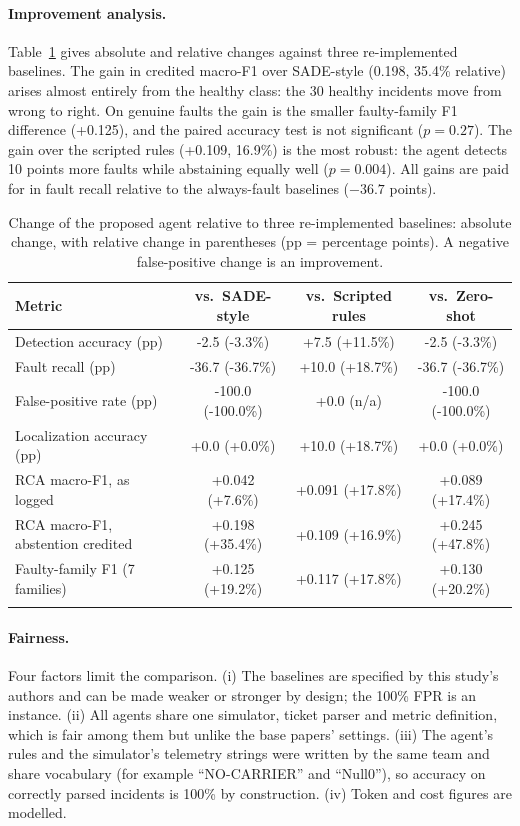 \documentclass[pdflatex,sn-basic,Numbered,iicol]{sn-jnl}
\begin{document}
\paragraph{Improvement analysis.} Table~\ref{tab:improve} gives absolute and relative changes against three re-implemented baselines. The gain in credited macro-F1 over SADE-style (0.198, 35.4\% relative) arises almost entirely from the healthy class: the 30 healthy incidents move from wrong to right. On genuine faults the gain is the smaller faulty-family F1 difference (+0.125), and the paired accuracy test is not significant ($p=0.27$). The gain over the scripted rules (+0.109, 16.9\%) is the most robust: the agent detects 10 points more faults while abstaining equally well ($p=0.004$). All gains are paid for in fault recall relative to the always-fault baselines ($-36.7$ points).

\begin{table}[t]
\caption{Change of the proposed agent relative to three re-implemented baselines: absolute change, with relative change in parentheses (pp = percentage points). A negative false-positive change is an improvement.}\label{tab:improve}
\scriptsize
\begin{tabular}{@{}lccc@{}}
\toprule
Metric & vs.\ SADE-style & vs.\ Scripted rules & vs.\ Zero-shot \\
\midrule
Detection accuracy (pp) & -2.5 (-3.3\%) & +7.5 (+11.5\%) & -2.5 (-3.3\%) \\
Fault recall (pp) & -36.7 (-36.7\%) & +10.0 (+18.7\%) & -36.7 (-36.7\%) \\
False-positive rate (pp) & -100.0 (-100.0\%) & +0.0 (n/a) & -100.0 (-100.0\%) \\
Localization accuracy (pp) & +0.0 (+0.0\%) & +10.0 (+18.7\%) & +0.0 (+0.0\%) \\
RCA macro-F1, as logged & +0.042 (+7.6\%) & +0.091 (+17.8\%) & +0.089 (+17.4\%) \\
RCA macro-F1, abstention credited & +0.198 (+35.4\%) & +0.109 (+16.9\%) & +0.245 (+47.8\%) \\
Faulty-family F1 (7 families) & +0.125 (+19.2\%) & +0.117 (+17.8\%) & +0.130 (+20.2\%) \\
\botrule
\end{tabular}
\end{table}

\paragraph{Fairness.} Four factors limit the comparison. (i) The baselines are specified by this study's authors and can be made weaker or stronger by design; the 100\% FPR is an instance. (ii) All agents share one simulator, ticket parser and metric definition, which is fair among them but unlike the base papers' settings. (iii) The agent's rules and the simulator's telemetry strings were written by the same team and share vocabulary (for example ``NO-CARRIER'' and ``Null0''), so accuracy on correctly parsed incidents is 100\% by construction. (iv) Token and cost figures are modelled.
\end{document}
